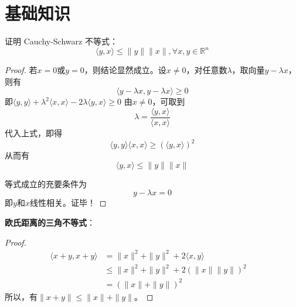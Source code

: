 \chapter{基础知识}
\begin{problemset}
    \item 证明 Cauchy-Schwarz 不等式：
    \[
        \langle y,x \rangle \leqslant \| y \| \| x \|, \forall x,y\in \mathbb{R}^{n}
    \]
    \begin{proof}
        若$x=0$或$y = 0$，则结论显然成立。设$x \neq 0$，对任意数$\lambda$，取向量$y-\lambda x$，则有\cite{yangming2006}
        \[
            \langle y-\lambda x,y-\lambda x \rangle \geqslant 0
        \]
        即$\langle y,y \rangle + \lambda^2\langle x,x \rangle - 2\lambda \langle y,x \rangle \geqslant 0$
        由$x\neq 0$，可取到
        \[
            \lambda = \dfrac{\langle y,x \rangle}{\langle x,x \rangle}
        \]
        代入上式，即得
        \[
            \langle y,y \rangle\langle x,x \rangle\geqslant (\langle y,x \rangle)^2
        \]
        从而有
        \[
            \langle y,x \rangle \leqslant \| y \| \| x \|
        \]

        等式成立的充要条件为
        \[
            y-\lambda x = 0
        \]
        即$y$和$x$线性相关。证毕！
    \end{proof}

    \textbf{欧氏距离的三角不等式}：
    \begin{proof}
        \[
            \begin{array}{ll}
                \langle x+y,x+y \rangle &= \|x\|^2 + \|y\|^{2} + 2\langle x,y \rangle \\
                &\leqslant  \|x\|^2 + \|y\|^{2} + 2(\|x\|\|y\|)^2\quad \\
                &=(\|x\| + \|y\|)^2
            \end{array}
        \]
        所以，有$\| x+y \|\leqslant \|x\| + \|y\|$。
        

\end{proof}
\end{problemset}
